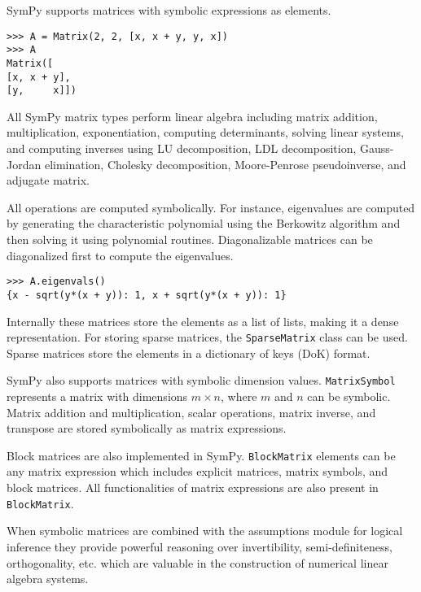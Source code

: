SymPy supports matrices with symbolic expressions as elements.

\begin{verbatim}
>>> A = Matrix(2, 2, [x, x + y, y, x])
>>> A
Matrix([
[x, x + y],
[y,     x]])
\end{verbatim}

All SymPy matrix types perform linear algebra including matrix addition,
multiplication, exponentiation, computing determinants, solving linear systems,
and computing inverses using LU decomposition, LDL decomposition, Gauss-Jordan
elimination, Cholesky decomposition, Moore-Penrose pseudoinverse, and adjugate
matrix.

All operations are computed symbolically. For instance, eigenvalues are computed
by generating the characteristic polynomial using the Berkowitz algorithm and
then solving it using polynomial routines. Diagonalizable matrices can be
diagonalized first to compute the eigenvalues.

\begin{verbatim}
>>> A.eigenvals()
{x - sqrt(y*(x + y)): 1, x + sqrt(y*(x + y)): 1}
\end{verbatim}

Internally these matrices store the elements as a list of lists, making it a dense
representation. For storing sparse matrices, the \verb|SparseMatrix| class can
be used. Sparse matrices store the elements in a dictionary of keys (DoK)
format.

SymPy also supports matrices with symbolic dimension values. \verb|MatrixSymbol|
represents a matrix with dimensions $m\times n$, where $m$ and $n$ can be
symbolic. Matrix addition and multiplication, scalar operations, matrix inverse,
and transpose are stored symbolically as matrix expressions.

Block matrices are also implemented in SymPy. \verb|BlockMatrix| elements can be any
matrix expression which includes explicit matrices, matrix symbols, and block
matrices. All functionalities of matrix expressions are also present in
\verb|BlockMatrix|.

When symbolic matrices are combined with the assumptions module for logical
inference they provide powerful reasoning over invertibility,
semi-definiteness, orthogonality, etc. which are valuable in the construction
of numerical linear algebra systems.
